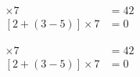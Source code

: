 \documentclass{article}
\begin{document}
\begin{align*}
[2 - (3+5)]\times 7 &= 42 \\
[2 + (3-5)]\times 7 &= 0
\end{align*}

\begin{align*}
[2 - (3+5)]\times 7 &= 42 \\{}
[2 + (3-5)]\times 7 &= 0
\end{align*}

\end{document}
